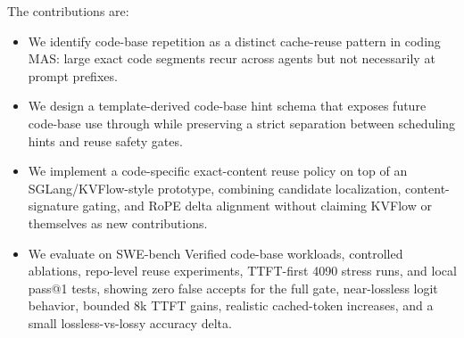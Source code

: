 The contributions are:
\begin{itemize}[leftmargin=*]
\item We identify code-base repetition as a distinct cache-reuse pattern in coding MAS: large exact code segments recur across agents but not necessarily at prompt prefixes.
\item We design a template-derived code-base hint schema that exposes future code-base use through \prefetchhint while preserving a strict separation between scheduling hints and reuse safety gates.
\item We implement a code-specific exact-content reuse policy on top of an SGLang/KVFlow-style prototype, combining candidate localization, content-signature gating, and RoPE delta alignment without claiming KVFlow or \kvcomm themselves as new contributions.
\item We evaluate \system on SWE-bench Verified code-base workloads, controlled ablations, repo-level reuse experiments, TTFT-first 4090 stress runs, and local pass@1 tests, showing zero false accepts for the full gate, near-lossless logit behavior, bounded 8k TTFT gains, realistic cached-token increases, and a small lossless-vs-lossy accuracy delta.
\end{itemize}
